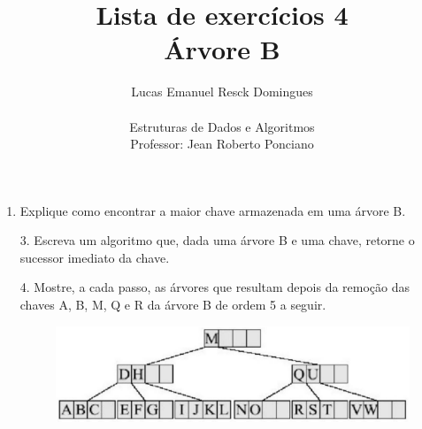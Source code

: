 \documentclass{article}
\title{Lista de exercícios 4 \\
\large Árvore B}
\author{Lucas Emanuel Resck Domingues \\ \\
Estruturas de Dados e Algoritmos \\
Professor: Jean Roberto Ponciano}
\begin{document}
    \maketitle

    \begin{enumerate}
        \item Explique como encontrar a maior chave armazenada em uma árvore B.
        
        \bigskip
        
        

        \bigskip

        \item[3.] Escreva um algoritmo que, dada uma árvore B e uma chave, retorne o sucessor imediato da chave.
        
        \bigskip
        
        

        \bigskip

        \item[4.] Mostre, a cada passo, as árvores que resultam depois da remoção das chaves A, B,
        M, Q e R da árvore B de ordem 5 a seguir.

        \begin{figure}[H]
            \centering
            \includegraphics[width=0.6\linewidth]{tree.png}
        \end{figure}
        
        \bigskip
        
        

        \bigskip
    \end{enumerate}
\end{document}
